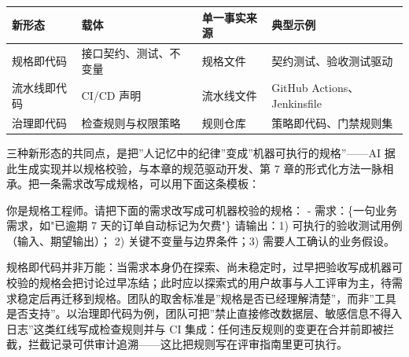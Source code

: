 \documentclass[12pt,a4paper,twoside,openany]{ctexbook}
\numberwithin{figure}{chapter}
\numberwithin{table}{chapter}
\newenvironment{Shaded}{}{}
\newcommand{\NormalTok}[1]{#1}
\newcounter{none}
\begin{document}
{\def\LTcaptype{none} %
\begin{longtable}[]{@{}
  >{\raggedright\arraybackslash}p{}
  >{\raggedright\arraybackslash}p{}
  >{\raggedright\arraybackslash}p{}
  >{\raggedright\arraybackslash}p{}@{}}
\toprule\noalign{}
\begin{minipage}[b]{\linewidth}\raggedright
新形态
\end{minipage} & \begin{minipage}[b]{\linewidth}\raggedright
载体
\end{minipage} & \begin{minipage}[b]{\linewidth}\raggedright
单一事实来源
\end{minipage} & \begin{minipage}[b]{\linewidth}\raggedright
典型示例
\end{minipage} \\
\midrule\noalign{}
\endhead
\bottomrule\noalign{}
\endlastfoot
规格即代码 & 接口契约、测试、不变量 & 规格文件 &
契约测试、验收测试驱动 \\
流水线即代码 & CI/CD 声明 & 流水线文件 & GitHub Actions、Jenkinsfile \\
治理即代码 & 检查规则与权限策略 & 规则仓库 & 策略即代码、门禁规则集 \\
\end{longtable}
}

三种新形态的共同点，是把''人记忆中的纪律''变成''机器可执行的规格''------AI
据此生成实现并以规格校验，与本章的规范驱动开发、第 7
章的形式化方法一脉相承。把一条需求改写成规格，可以用下面这条模板：

\begin{Shaded}
\begin{Highlighting}[]
\NormalTok{你是规格工程师。请把下面的需求改写成可机器校验的规格：}
\NormalTok{{-} 需求：\{一句业务需求，如"已逾期 7 天的订单自动标记为欠费"\}}
\NormalTok{请输出：1) 可执行的验收测试用例（输入、期望输出）；}
\NormalTok{2) 关键不变量与边界条件；3) 需要人工确认的业务假设。}
\end{Highlighting}
\end{Shaded}

规格即代码并非万能：当需求本身仍在探索、尚未稳定时，过早把验收写成机器可校验的规格会把讨论过早冻结；此时应以探索式的用户故事与人工评审为主，待需求稳定后再迁移到规格。团队的取舍标准是''规格是否已经理解清楚''，而非''工具是否支持''。以治理即代码为例，团队可把''禁止直接修改数据层、敏感信息不得入日志''这类红线写成检查规则并与
CI
集成：任何违反规则的变更在合并前即被拦截，拦截记录可供审计追溯------这比把规则写在评审指南里更可执行。
\end{document}

